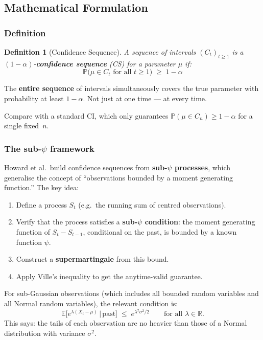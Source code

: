 \documentclass[12pt, a4paper]{article}
\newtheorem{definition}{Definition}
\newcommand{\E}{\mathbb{E}}            %
\newcommand{\Prob}{\mathbb{P}}         %
\newcommand{\given}{\,\vert\,}         %
\newcommand{\R}{\mathbb{R}}
\begin{document}
\subsection{Mathematical Formulation}

\subsubsection*{Definition}

\begin{definition}[Confidence Sequence]
A sequence of intervals $(C_t)_{t \geq 1}$ is a $(1-\alpha)$-\textbf{confidence
sequence} (CS) for a parameter $\mu$ if:
\[
  \boxed{\Prob\!\bigl(\mu \in C_t \text{ for all } t \geq 1\bigr) \;\geq\; 1-\alpha}
\]
\end{definition}

\begin{plainlanguage}
The \textbf{entire sequence} of intervals simultaneously covers the true
parameter with probability at least $1-\alpha$.  Not just at one time ---
at every time.
\end{plainlanguage}

Compare with a standard CI, which only guarantees $\Prob(\mu \in C_n) \geq
1-\alpha$ for a single fixed~$n$.

\subsubsection*{The sub-$\psi$ framework}

Howard et al.\ build confidence sequences from \textbf{sub-$\psi$ processes},
which generalise the concept of ``observations bounded by a moment generating
function.''  The key idea:

\begin{enumerate}[nosep]
  \item Define a process $S_t$ (e.g.\ the running sum of centred observations).
  \item Verify that the process satisfies a \textbf{sub-$\psi$ condition}:
        the moment generating function of $S_t - S_{t-1}$, conditional on the
        past, is bounded by a known function $\psi$.
  \item Construct a \textbf{supermartingale} from this bound.
  \item Apply Ville's inequality to get the anytime-valid guarantee.
\end{enumerate}

For sub-Gaussian observations (which includes all bounded random variables
and all Normal random variables), the relevant condition is:
\[
  \E\!\bigl[e^{\lambda(X_t - \mu)} \given \text{past}\bigr]
  \;\leq\;
  e^{\lambda^2 \sigma^2 / 2}
  \qquad \text{for all } \lambda \in \R.
\]
This says: the tails of each observation are no heavier than those of a Normal
distribution with variance $\sigma^2$.
\end{document}
